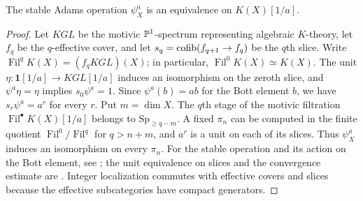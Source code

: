 \begin{lemma}\label{lem:paper-brauer-power-adams}
The stable Adams operation $\psi_X^a$ is an equivalence on $K(X)[1/a]$.
\end{lemma}
\begin{proof}
Let $KGL$ be the motivic $\mathbb P^1$-spectrum representing algebraic $K$-theory, let $f_q$ be the $q$-effective cover, and let $s_q=\operatorname{cofib}(f_{q+1}\to f_q)$ be the $q$th slice.
Write $\operatorname{Fil}^qK(X)=(f_qKGL)(X)$; in particular, $\operatorname{Fil}^0K(X)\simeq K(X)$.
The unit $\eta:\mathbf1[1/a]\to KGL[1/a]$ induces an isomorphism on the zeroth slice, and $\psi^a\eta=\eta$ implies $s_0\psi^a=1$.
Since $\psi^a(b)=ab$ for the Bott element $b$, we have $s_r\psi^a=a^r$ for every $r$.
Put $m=\dim X$.
The $q$th stage of the motivic filtration $\operatorname{Fil}^\bullet K(X)[1/a]$ belongs to $\mathrm{Sp}_{\ge q-m}$.
A fixed $\pi_n$ can be computed in the finite quotient $\operatorname{Fil}^0/\operatorname{Fil}^q$ for $q>n+m$, and $a^r$ is a unit on each of its slices.
Thus $\psi_X^a$ induces an isomorphism on every $\pi_n$.
For the stable operation and its action on the Bott element, see \cite[Example 9.6]{AnnalaHoyoisIwasa}; the unit equivalence on slices and the convergence estimate are \cite[Corollaries 9.5 and 9.7]{BachmannElmantoMorrow}.
Integer localization commutes with effective covers and slices because the effective subcategories have compact generators.
\end{proof}

